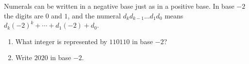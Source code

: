 Numerals can be written in a negative base just as in a positive base. In base $-2$ the digits are $0$ and $1$, and the numeral $d_kd_{k-1}\dots d_1d_0$ means $d_k(-2)^k+\cdots+d_1(-2)+d_0$.
\begin{enumerate}
\item[(a)] What integer is represented by $110110$ in base $-2$?
\item[(b)] Write $2020$ in base $-2$.
\end{enumerate}
